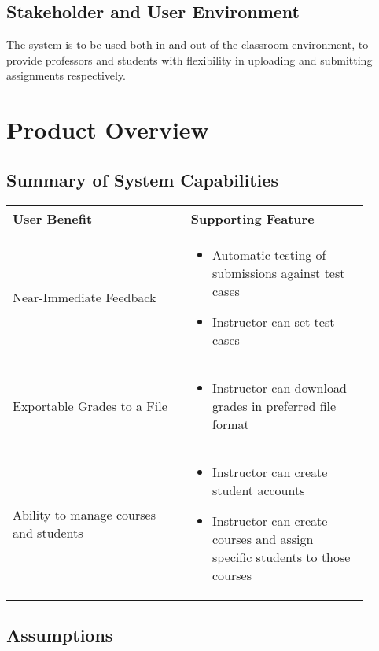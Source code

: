 \documentclass{article}
\begin{document}
\subsection{Stakeholder and User Environment}

The system is to be used both in and out of the classroom environment, to provide professors and students with flexibility in uploading and submitting assignments respectively.

\section{Product Overview}

\subsection{Summary of System Capabilities}

\begin{center}
  \begin{tabular}{| p{0.45\linewidth} | p{0.45\linewidth} |}
    \hline
    \textbf{User Benefit} & \textbf{Supporting Feature}\\
    \hline
    \hline
    Near-Immediate Feedback & \begin{itemize}
      \item Automatic testing of submissions against test cases
      \item Instructor can set test cases
    \end{itemize}\\
    \hline
    Exportable Grades to a File& \begin{itemize}
      \item Instructor can download grades in preferred file format
    \end{itemize}\\
    \hline
    Ability to manage courses and students & \begin{itemize}
      \item Instructor can create student accounts
      \item Instructor can create courses and assign specific students to those courses
    \end{itemize}\\
    \hline

  \end{tabular}
\end{center}

\subsection{Assumptions}
\end{document}
